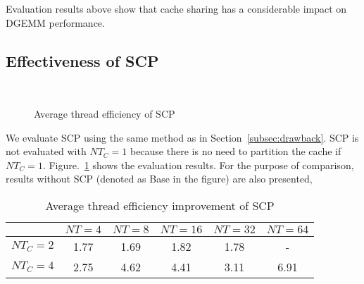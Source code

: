 Evaluation results above show that cache sharing has a considerable
impact on DGEMM performance. 

\subsection{Effectiveness of SCP}\label{subsec:benefit}

\begin{figure}
  \centering
  \\
  \caption{Average thread efficiency of SCP}
  \label{fig:benefit}
\end{figure}

We evaluate SCP using the same method as in Section~\ref{subsec:drawback}.
SCP is not evaluated with $NT_C=1$ because there is no need
to partition the cache if $NT_C=1$.
Figure.~\ref{fig:benefit} shows the evaluation results.
For the purpose of comparison, results without SCP
(denoted as Base in the figure) are also presented,

\begin{table}
  \centering
  \caption{Average thread efficiency improvement of SCP}
  \label{tab:win}
  \setlength{\tabcolsep}{3.5pt}
  \begin{tabular}{cccccc}
    \toprule
     & $NT=4$ & $NT=8$ & $NT=16$ & $NT=32$ & $NT=64$ \\
    \midrule
    $NT_C=2$ & 1.77 & 1.69 & 1.82 & 1.78 & - \\
    $NT_C=4$ & 2.75 & 4.62 & 4.41 & 3.11 & 6.91 \\
    \bottomrule
  \end{tabular}
\end{table}


